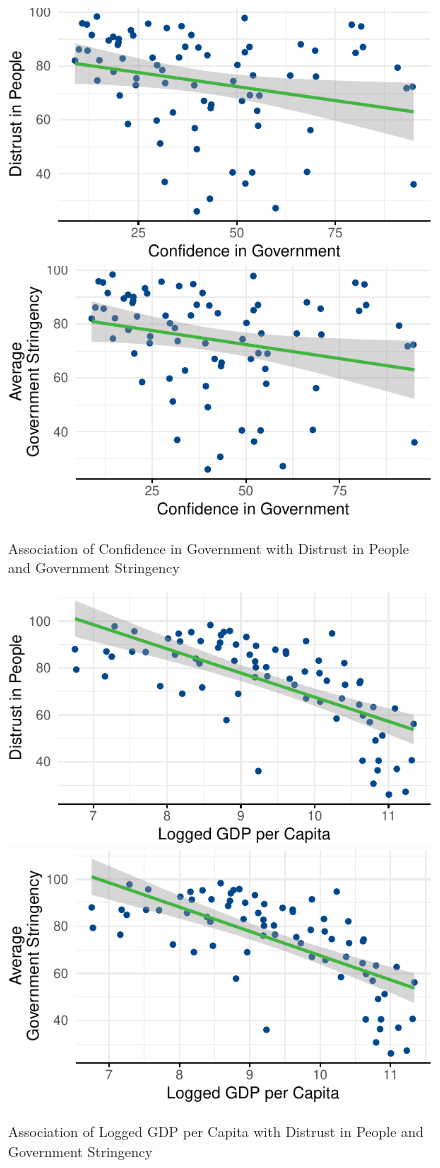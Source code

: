 \documentclass[
  12pt,
]{article}
\begin{document}
\begin{figure}
\includegraphics[width=0.48\linewidth]{write_up_test_files/figure-latex/conf-plots-1} \includegraphics[width=0.48\linewidth]{write_up_test_files/figure-latex/conf-plots-2} \caption{Association of Confidence in Government with Distrust in People and Government Stringency}\label{fig:conf-plots}
\end{figure}

\begin{figure}
\includegraphics[width=0.48\linewidth]{write_up_test_files/figure-latex/gdp-plots-1} \includegraphics[width=0.48\linewidth]{write_up_test_files/figure-latex/gdp-plots-2} \caption{Association of Logged GDP per Capita with Distrust in People and Government Stringency}\label{fig:gdp-plots}
\end{figure}
\end{document}
